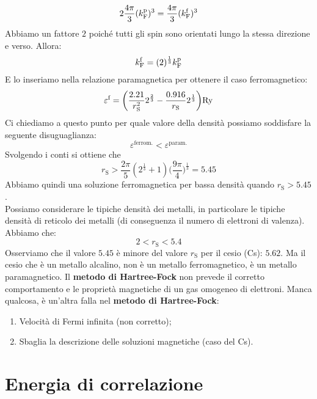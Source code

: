 \begin{equation*}
    2\frac{4\pi}{3}(k_{\text F}^{\text{p}})^3=\frac{4\pi}{3}(k_{\text F}^{\text f})^3
\end{equation*}
Abbiamo un fattore $2$ poiché tutti gli spin sono orientati lungo la stessa direzione e verso. Allora:
\begin{equation*}
    k_{\text F}^{\text f}=(2)^{\frac 13}k_{\text F}^{\text p}
\end{equation*}
E lo inseriamo nella relazione paramagnetica per ottenere il caso ferromagnetico:
\begin{equation*}
    \varepsilon^{\text f}=\bigg(\frac{2.21}{r_\text{S}^2}2^{\frac 23}-\frac{0.916}{r_\text{S}}2^{\frac 13}\bigg)\text{Ry}
\end{equation*}
Ci chiediamo a questo punto per quale valore della densità possiamo soddisfare la seguente disuguaglianza:
\begin{equation*}
    \varepsilon^{\text {ferrom.}} < \varepsilon^{\text {param.}}
\end{equation*}
Svolgendo i conti si ottiene che 
\begin{equation*}
    r_\text{S} > \frac{2\pi}{5}(2^{\frac 13}+1)\bigg(\frac{9\pi}{4}\bigg)^{\frac 13}=5.45
\end{equation*}
Abbiamo quindi una soluzione ferromagnetica per bassa densità quando $r_\text{S} > 5.45$. \\
Possiamo considerare le tipiche densità dei metalli, in particolare le tipiche densità di reticolo dei metalli (di conseguenza il numero di elettroni di valenza). Abbiamo che:
\begin{equation*}
    2<r_\text{S}<5.4
\end{equation*}
Osserviamo che il valore $5.45$ è minore del valore $r_\text{S}$ per il cesio (Cs): $5.62$. Ma il cesio che è un metallo alcalino, non è un metallo ferromagnetico, è un metallo paramagnetico. Il \textbf{metodo di Hartree-Fock} non prevede il corretto comportamento e le proprietà magnetiche di un gas omogeneo di elettroni. Manca qualcosa, è un'altra falla nel \textbf{metodo di Hartree-Fock}:
\begin{enumerate}
    \item Velocità di Fermi infinita (non corretto);
    \item Sbaglia la descrizione delle soluzioni magnetiche (caso del Cs).
\end{enumerate}

\section{Energia di correlazione}

